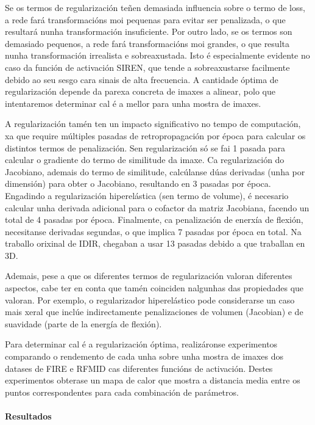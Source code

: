 Se os termos de regularización teñen demasiada influencia sobre o termo de loss, a rede fará transformacións moi pequenas para evitar ser penalizada, o que resultará nunha transformación insuficiente.
Por outro lado, se os termos son demasiado pequenos, a rede fará transformacións moi grandes, o que resulta nunha transformación irrealista e sobreaxustada. Isto é especialmente evidente no caso da función de activación SIREN, que tende a sobreaxustarse facilmente debido ao seu sesgo cara sinais de alta frecuencia.
A cantidade óptima de regularización depende da parexa concreta de imaxes a alinear, polo que intentaremos determinar cal é a mellor para unha mostra de imaxes.

A regularización tamén ten un impacto significativo no tempo de computación, xa que require múltiples pasadas de retropropagación por época para calcular os distintos termos de penalización.
Sen regularización só se fai 1 pasada para calcular o gradiente do termo de similitude da imaxe.
Ca regularización do Jacobiano, ademais do termo de similitude, calcúlanse dúas derivadas (unha por dimensión) para obter o Jacobiano, resultando en 3 pasadas por época.
Engadindo a regularización hiperelástica (sen termo de volume), é necesario calcular unha derivada adicional para o cofactor da matriz Jacobiana, facendo un total de 4 pasadas por época.
Finalmente, ca penalización de enerxía de flexión, necesitanse derivadas segundas, o que implica 7 pasadas por época en total.
Na traballo orixinal de IDIR, chegaban a usar 13 pasadas debido a que traballan en 3D.

Ademais, pese a que os diferentes termos de regularización valoran diferentes aspectos, cabe ter en conta que tamén coinciden nalgunhas das propiedades que valoran.
Por exemplo, o regularizador hiperelástico pode considerarse un caso mais xeral que inclúe indirectamente penalizaciones de volumen (Jacobian) e de suavidade (parte de la energía de flexión).

Para determinar cal é a regularización óptima, realizáronse experimentos comparando o rendemento de cada unha sobre unha mostra de imaxes dos datases de FIRE e RFMID cas diferentes funcións de activación.
Destes experimentos obterase un mapa de calor que mostra a distancia media entre os puntos correspondentes para cada combinación de parámetros.

\paragraph{Resultados}
\label{par:Resultados-regularization}


